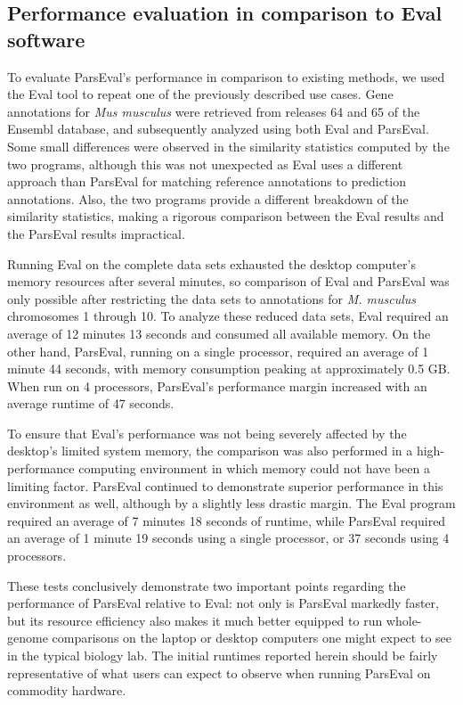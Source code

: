 \subsection{Performance evaluation in comparison to Eval software}
To evaluate ParsEval's performance in comparison to existing methods, we used the Eval tool \citep{Keibler} to repeat one of the previously described use cases.
Gene annotations for \textit{Mus musculus} were retrieved from releases 64 and 65 of the Ensembl database, and subsequently analyzed using both Eval and ParsEval.
Some small differences were observed in the similarity statistics computed by the two programs, although this was not unexpected as Eval uses a different approach than ParsEval for matching reference annotations to prediction annotations.
Also, the two programs provide a different breakdown of the similarity statistics, making a rigorous comparison between the Eval results and the ParsEval results impractical.

Running Eval on the complete data sets exhausted the desktop computer's memory resources after several minutes, so comparison of Eval and ParsEval was only possible after restricting the data sets to annotations for \textit{M. musculus} chromosomes 1 through 10.
To analyze these reduced data sets, Eval required an average of 12 minutes 13 seconds and consumed all available memory.
On the other hand, ParsEval, running on a single processor, required an average of 1 minute 44 seconds, with memory consumption peaking at approximately 0.5 GB.
When run on 4 processors, ParsEval's performance margin increased with an average runtime of 47 seconds.

To ensure that Eval's performance was not being severely affected by the desktop's limited system memory, the comparison was also performed in a high-performance computing environment in which memory could not have been a limiting factor.
ParsEval continued to demonstrate superior performance in this environment as well, although by a slightly less drastic margin.
The Eval program required an average of 7 minutes 18 seconds of runtime, while ParsEval required an average of 1 minute 19 seconds using a single processor, or 37 seconds using 4 processors.

These tests conclusively demonstrate two important points regarding the performance of ParsEval relative to Eval: not only is ParsEval markedly faster, but its resource efficiency also makes it much better equipped to run whole-genome comparisons on the laptop or desktop computers one might expect to see in the typical biology lab.
The initial runtimes reported herein should be fairly representative of what users can expect to observe when running ParsEval on commodity hardware.



